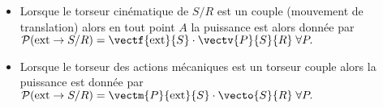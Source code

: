 

\begin{remarque}%
\begin{itemize}
\item Lorsque le torseur cinématique de $S/R$ est un couple (mouvement de translation) alors en tout point $A$ la puissance est alors donnée par
$
\mathcal{P}(\text{ext} \rightarrow S/R)=\vectf{\text{ext}}{S}\cdot \vectv{P}{S}{R} \;
\forall P.
$

\item Lorsque le torseur des actions mécaniques est un torseur couple alors la puissance est donnée par
$
\mathcal{P}(\text{ext} \rightarrow S/R)=\vectm{P}{\text{ext}}{S}\cdot\vecto{S}{R}\;
\forall P.
$

\end{itemize}
\end{remarque}%




%
%
%
% 
%
%
%
%


